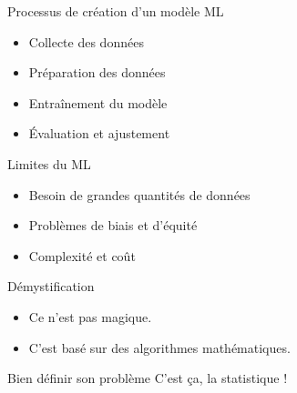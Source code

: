 \begin{frame}{Processus de création d'un modèle ML}
  \begin{itemize}
   \item  Collecte des données
   \item  Préparation des données
   \item  Entraînement du modèle
   \item  Évaluation et ajustement
  \end{itemize}
\end{frame}

\begin{frame}{Limites du ML}
  \begin{itemize}
  \item Besoin de grandes quantités de données
  \item Problèmes de biais et d'équité
  \item Complexité et coût
  \end{itemize}
\end{frame}

\begin{frame}{Démystification}
  \begin{itemize}
  \item Ce n'est pas magique.
  \item C'est basé sur des algorithmes mathématiques.
  \end{itemize}
\end{frame}

\begin{frame}{Bien définir son problème}
  C'est ça, la statistique !
\end{frame}

